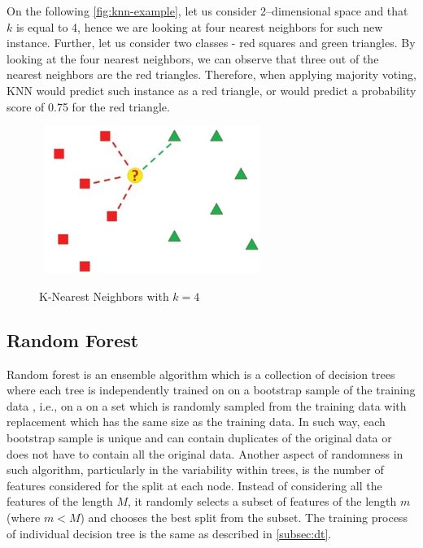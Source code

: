 On the following \autoref{fig:knn-example}, let us consider 2--dimensional space and that $k$ is equal to 4, hence we are looking at four nearest neighbors for such new instance. Further, let us consider two classes - red squares and green triangles.
By looking at the four nearest neighbors, we can observe that three out of the nearest neighbors are the red triangles.
Therefore, when applying majority voting, KNN would predict such instance as a red triangle, or would predict a probability score of 0.75 for the red triangle.

\begin{figure}[H]
    \centering
    \caption{K-Nearest Neighbors with $k=4$}\vspace{0.5em}
    \label{fig:knn-example}\
    \includegraphics[width=70mm]{Figures/KNN_example.jpg}

    \vspace{-1em}
\end{figure}
\subsection{Random Forest}

Random forest is an ensemble algorithm which is a collection of decision trees where each tree is independently trained on on a bootstrap sample of the training data \citep{han2011data}, i.e., on a on a set which is randomly sampled from the training data with replacement which has the same size as the training data. In such way, each bootstrap sample is unique and can contain duplicates of the original data or does not have to contain all the original data.
Another aspect of randomness in such algorithm, particularly in the variability within trees, is the number of features considered for the split at each node.
Instead of considering all the features of the length $M$, it randomly selects a subset of features of the length $m$ (where $m<M$) and chooses the best split from the subset.
The training process of individual decision tree is the same as described in \autoref{subsec:dt}.

